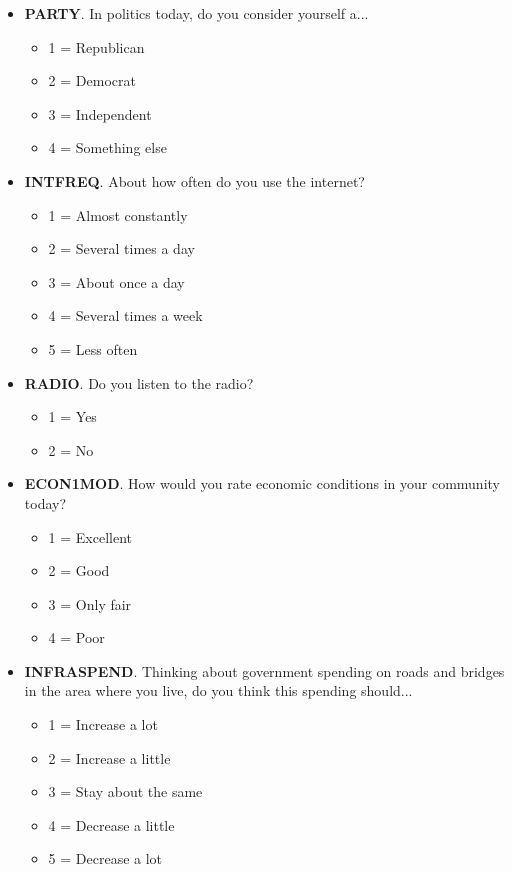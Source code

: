 \documentclass[11pt]{article}
\begin{document}
\begin{itemize}
    \item \textbf{PARTY}. In politics today, do you consider yourself a...
    \begin{itemize}
        \item 1 = Republican
        \item 2 = Democrat
        \item 3 = Independent
        \item 4 = Something else
    \end{itemize}

    \item \textbf{INTFREQ}. About how often do you use the internet?
    \begin{itemize}
        \item 1 = Almost constantly
        \item 2 = Several times a day
        \item 3 = About once a day
        \item 4 = Several times a week
        \item 5 = Less often
    \end{itemize}

    \item \textbf{RADIO}. Do you listen to the radio?
    \begin{itemize}
        \item 1 = Yes
        \item 2 = No
    \end{itemize}

    \item \textbf{ECON1MOD}. How would you rate economic conditions in your community today?
    \begin{itemize}
        \item 1 = Excellent
        \item 2 = Good
        \item 3 = Only fair
        \item 4 = Poor
    \end{itemize}

    \item \textbf{INFRASPEND}. Thinking about government spending on roads and bridges in the area where you live, do you think this spending should...
    \begin{itemize}
        \item 1 = Increase a lot
        \item 2 = Increase a little
        \item 3 = Stay about the same
        \item 4 = Decrease a little
        \item 5 = Decrease a lot
    \end{itemize}


\end{itemize}
\end{document}
